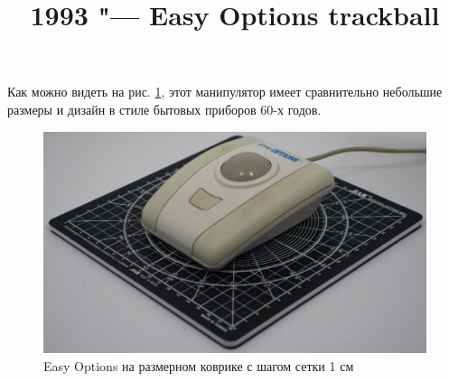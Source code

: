 \documentclass[11pt, a4paper]{article}
\begin{document}
\title{1993 "--- Easy Options trackball}
\date{}
\maketitle

Как можно видеть на рис. \ref{fig:EasyOptionsSize}, этот манипулятор имеет сравнительно небольшие размеры и дизайн в стиле бытовых приборов 60-х годов.
\begin{figure}[h]
    \centering
    \includegraphics[scale=0.4]{1993_easy_options_trackball/opt.jpg}
    \caption{Easy Options на размерном коврике с шагом сетки 1 см}
    \label{fig:EasyOptionsSize}
\end{figure}
\end{document}
